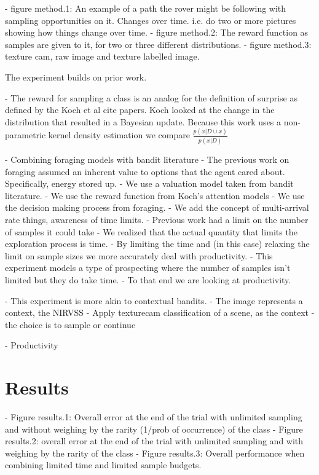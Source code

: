 \documentclass[preprint,12pt,3p]{elsarticle}
\begin{document}
	- figure method.1: An example of a path the rover might be following with sampling opportunities on it.  Changes over time. i.e. do two or more pictures showing how things change over time.
	- figure method.2: The reward function as samples are given to it, for two or three different distributions.
	- figure method.3: texture cam, raw image and texture labelled image.

	The experiment builds on prior work.  

	- The reward for sampling a class is an analog for the definition of surprise as defined by the Koch et al {cite papers}.  Koch looked at the change in the distribution that resulted in a Bayesian update.  Because this work uses a non-parametric kernel density estimation we compare $\frac{p(x|D\cup{x})}{p(x|D)}$

	- Combining foraging models with bandit literature 
		- The previous work on foraging assumed an inherent value to
			options that the agent cared about.  Specifically, energy stored up.
		- We use a valuation model taken from bandit literature.  
		- We use the reward function from Koch's attention models
		- We use the decision making process from foraging. 
		- We add the concept of multi-arrival rate things, awareness of time limits.
	- Previous work had a limit on the number of samples it could take
		- We realized that the actual quantity that limits the exploration process
			is time.
		- By limiting the time and (in this case) relaxing the limit on sample sizes
			we more accurately deal with productivity.  
	- This experiment models a type of prospecting where the number of samples isn't limited but they do take time. 
	- To that end we are looking at productivity.

	-  This experiment is more akin to contextual bandits.  
	- The image represents a context, the NIRVSS 
	- Apply texturecam classification of a scene, as the context
	- the choice is to sample or continue

	- Productivity 


\section{Results}
\label{sec:results}


- Figure results.1: Overall error at the end of the trial with unlimited sampling and without weighing by the rarity (1/prob of occurrence) of the class
- Figure results.2: overall error at the end of the trial with unlimited sampling and with weighing by the rarity of the class
- Figure results.3: Overall performance when combining limited time and limited sample budgets.
\end{document}

